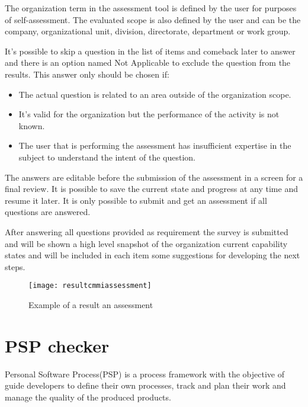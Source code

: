 The organization term in the assessment tool is defined by the user for purposes of  self-assessment. The evaluated scope is also defined by the user and can be the company, organizational unit, division, directorate, department or work group.

It's possible to skip a question in the list of items and comeback later to answer and there is an option named Not Applicable to exclude the question from the results. This answer only should be chosen if:
\begin{itemize}
	\item The actual question is related to an area outside of the organization scope.
	\item It's valid for the organization but the  performance of the activity is not known.
	\item The user that is performing the assessment has insufficient expertise in the subject to understand the intent of the question.
\end{itemize}

The answers are editable before the submission of the assessment in a screen for a final review. It is possible to save the current state and progress at any time and resume it later. It is only possible to submit and get an assessment if all questions are answered.

After answering all questions provided as requirement the survey is submitted and will be shown a high level snapshot of the organization  current capability states and will be included in each item some suggestions for developing the next steps.

\newpage

\begin{figure}[h]
	\begin{center}
		\leavevmode
		\texttt{[image: resultcmmiassessment]}
		\caption{Example of a result an assessment}
		\label{fig:assesment_result}
	\end{center}
\end{figure}


\section{PSP checker}

Personal Software Process(PSP) \citep{humphrey2005psp} is a process framework with the objective of guide developers to define their own processes, track and plan their work and manage the quality of the produced products.

